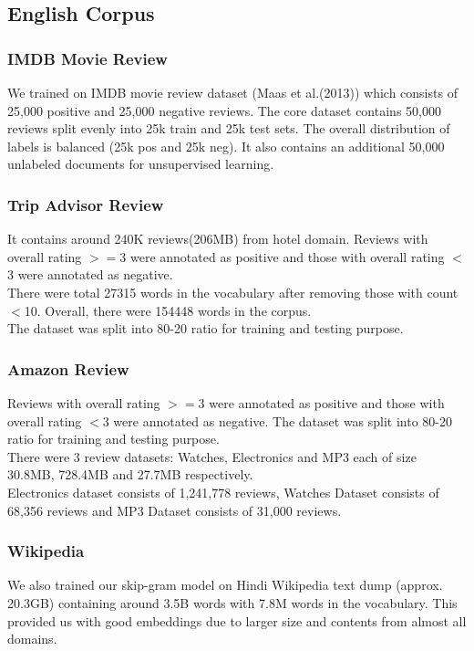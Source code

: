 \documentclass[11pt,a4paper]{article}
\begin{document}
\subsection{English Corpus}
\label{english_corpus}
\subsubsection{IMDB Movie Review}
We trained on IMDB movie review dataset (Maas et al.(2013)) which consists of 25,000 positive and 25,000 negative reviews. The core dataset contains 50,000 reviews split evenly into 25k train and 25k test sets. The overall distribution of labels is balanced (25k pos and 25k neg). It also contains an additional 50,000 unlabeled documents for unsupervised learning.\\

\subsubsection{Trip Advisor Review}
It contains around 240K reviews(206MB) from hotel domain. Reviews with overall rating $>=$3 were annotated as positive and those with overall rating $<$3 were annotated as negative.\\
There were total 27315 words in the vocabulary after removing those with count $<$10. Overall, there were 154448 words in the corpus.\\
The dataset was split into 80-20 ratio for training and testing purpose.\\

\subsubsection{Amazon Review}
\label{data:amazon}
Reviews with overall rating $>=$3 were annotated as positive and those with overall rating $<$3 were annotated as negative. The dataset was split into 80-20 ratio for training and testing purpose.\\
There were 3 review datasets: Watches, Electronics and MP3 each of size 30.8MB, 728.4MB and 27.7MB respectively.\\
Electronics dataset consists of 1,241,778 reviews, Watches Dataset consists of 68,356 reviews and MP3 Dataset consists of 31,000 reviews.

\subsubsection{Wikipedia}
We also trained our skip-gram model on Hindi Wikipedia text dump (approx. 20.3GB) containing around 3.5B words with 7.8M words in the vocabulary. This provided us with good embeddings due to larger size and contents from almost all domains.
\end{document}
